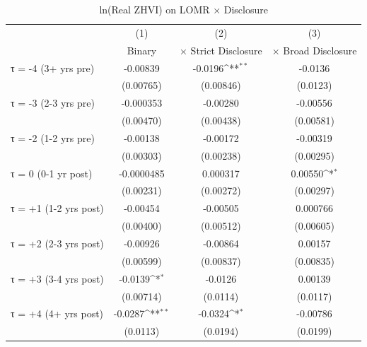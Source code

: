 \begin{table}[htbp]\centering
\def\sym#1{\ifmmode^{#1}\else\(^{#1}\)\fi}
\caption{ln(Real ZHVI) on LOMR × Disclosure}
\begin{tabular}{l*{3}{c}}
\hline\hline
                    &\multicolumn{1}{c}{(1)}&\multicolumn{1}{c}{(2)}&\multicolumn{1}{c}{(3)}\\
                    &\multicolumn{1}{c}{Binary}&\multicolumn{1}{c}{× Strict Disclosure}&\multicolumn{1}{c}{× Broad Disclosure}\\
\hline
τ = -4 (3+ yrs pre) &    -0.00839         &     -0.0196\sym{**} &     -0.0136         \\
                    &   (0.00765)         &   (0.00846)         &    (0.0123)         \\
[1em]
τ = -3 (2-3 yrs pre)&   -0.000353         &    -0.00280         &    -0.00556         \\
                    &   (0.00470)         &   (0.00438)         &   (0.00581)         \\
[1em]
τ = -2 (1-2 yrs pre)&    -0.00138         &    -0.00172         &    -0.00319         \\
                    &   (0.00303)         &   (0.00238)         &   (0.00295)         \\
[1em]
τ = 0 (0-1 yr post) &  -0.0000485         &    0.000317         &     0.00550\sym{*}  \\
                    &   (0.00231)         &   (0.00272)         &   (0.00297)         \\
[1em]
τ = +1 (1-2 yrs post)&    -0.00454         &    -0.00505         &    0.000766         \\
                    &   (0.00400)         &   (0.00512)         &   (0.00605)         \\
[1em]
τ = +2 (2-3 yrs post)&    -0.00926         &    -0.00864         &     0.00157         \\
                    &   (0.00599)         &   (0.00837)         &   (0.00835)         \\
[1em]
τ = +3 (3-4 yrs post)&     -0.0139\sym{*}  &     -0.0126         &     0.00139         \\
                    &   (0.00714)         &    (0.0114)         &    (0.0117)         \\
[1em]
τ = +4 (4+ yrs post)&     -0.0287\sym{**} &     -0.0324\sym{*}  &    -0.00786         \\
                    &    (0.0113)         &    (0.0194)         &    (0.0199)         \\

\end{tabular}
\end{table}
